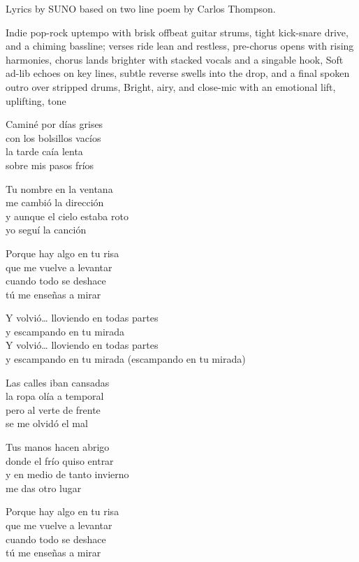 
\begin{notes}
Lyrics by SUNO based on two line poem by Carlos Thompson.
\end{notes}
\begin{style}
Indie pop-rock uptempo with brisk offbeat guitar strums, tight kick-snare drive, and a chiming bassline; verses ride lean and restless, pre-chorus opens with rising harmonies, chorus lands brighter with stacked vocals and a singable hook, Soft ad-lib echoes on key lines, subtle reverse swells into the drop, and a final spoken outro over stripped drums, Bright, airy, and close-mic with an emotional lift, uplifting, tone
\end{style}
\begin{lyrics}
Caminé por días grises\\
con los bolsillos vacíos\\
la tarde caía lenta\\
sobre mis pasos fríos

Tu nombre en la ventana\\
me cambió la dirección\\
y aunque el cielo estaba roto\\
yo seguí la canción

Porque hay algo en tu risa\\
que me vuelve a levantar\\
cuando todo se deshace\\
tú me enseñas a mirar

Y volvió… lloviendo en todas partes\\
y escampando en tu mirada\\
Y volvió… lloviendo en todas partes\\
y escampando en tu mirada
(escampando en tu mirada)

Las calles iban cansadas\\
la ropa olía a temporal\\
pero al verte de frente\\
se me olvidó el mal

Tus manos hacen abrigo\\
donde el frío quiso entrar\\
y en medio de tanto invierno\\
me das otro lugar

Porque hay algo en tu risa\\
que me vuelve a levantar\\
cuando todo se deshace\\
tú me enseñas a mirar


\end{lyrics}
